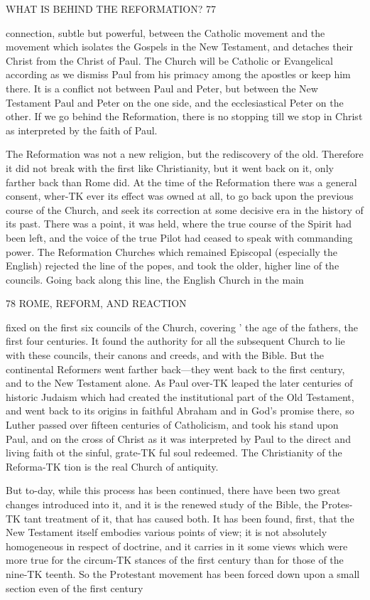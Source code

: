 \documentclass[12pt,a5paper,oneside]{book}
\begin{document}
WHAT IS BEHIND THE REFORMATION? 77 

connection, subtle but powerful, between the Catholic 
movement and the movement which isolates the 
Gospels in the New Testament, and detaches their 
Christ from the Christ of Paul. The Church will 
be Catholic or Evangelical according as we dismiss 
Paul from his primacy among the apostles or keep 
him there. It is a conflict not between Paul and 
Peter, but between the New Testament Paul and 
Peter on the one side, and the ecclesiastical Peter on 
the other. If we go behind the Reformation, there 
is no stopping till we stop in Christ as interpreted by 
the faith of Paul. 

The Reformation was not a new religion, but the 
rediscovery of the old. Therefore it did not break 
with the first like Christianity, but it went back on it, 
only farther back than Rome did. At the time of 
the Reformation there was a general consent, wher-TK
ever its effect was owned at all, to go back upon the 
previous course of the Church, and seek its correction 
at some decisive era in the history of its past. There 
was a point, it was held, where the true course of the 
Spirit had been left, and the voice of the true Pilot 
had ceased to speak with commanding power. The 
Reformation Churches which remained Episcopal 
(especially the English) rejected the line of the popes, 
and took the older, higher line of the councils. Going 
back along this line, the English Church in the main 



78 ROME, REFORM, AND REACTION 

fixed on the first six councils of the Church, covering ' 
the age of the fathers, the first four centuries. It 
found the authority for all the subsequent Church to 
lie with these councils, their canons and creeds, and 
with the Bible. But the continental Reformers went 
farther back---they went back to the first century, 
and to the New Testament alone. As Paul over-TK
leaped the later centuries of historic Judaism which had 
created the institutional part of the Old Testament, 
and went back to its origins in faithful Abraham and 
in God's promise there, so Luther passed over fifteen 
centuries of Catholicism, and took his stand upon Paul, 
and on the cross of Christ as it was interpreted by 
Paul to the direct and living faith ot the sinful, grate-TK
ful soul redeemed. The Christianity of the Reforma-TK
tion is the real Church of antiquity. 

But to-day, while this process has been continued, 
there have been two great changes introduced into it, 
and it is the renewed study of the Bible, the Protes-TK
tant treatment of it, that has caused both. It has 
been found, first, that the New Testament itself 
embodies various points of view; it is not absolutely 
homogeneous in respect of doctrine, and it carries in 
it some views which were more true for the circum-TK
stances of the first century than for those of the nine-TK
teenth. So the Protestant movement has been forced 
down upon a small section even of the first century 
\end{document}
